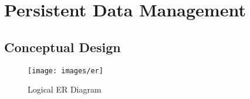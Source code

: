 \chapter{Persistent Data Management}

	\section{Conceptual Design}

	\begin{figure}[H]
		\centering
		\texttt{[image: images/er]}
		\caption{Logical ER Diagram}
		\label{fig:er}
	\end{figure}